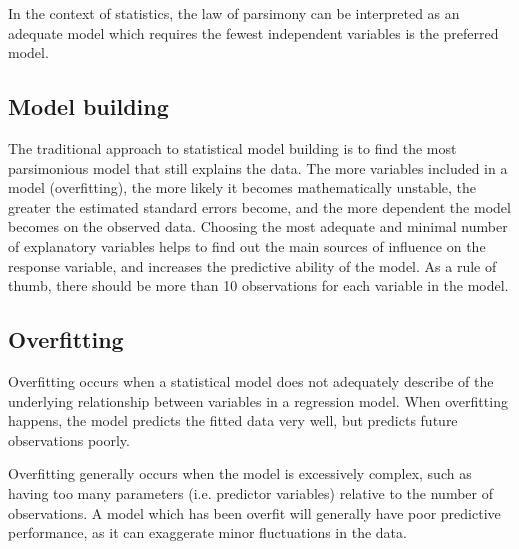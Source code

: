 \documentclass[a4paper,12pt]{article}
\begin{document}
In the context of statistics, the law of parsimony can be interpreted as an adequate model which requires the fewest independent variables is the preferred model.

\subsection{Model building}

The traditional approach to statistical model building is to find the most parsimonious model that still explains the data. The more variables included in a model (overfitting), the more likely it becomes mathematically unstable, the greater the estimated standard errors become, and the more dependent the model becomes on the observed data. Choosing the most adequate and minimal number of explanatory variables helps to find out the main sources of influence on the response variable, and increases the predictive ability of the model. As a rule of thumb, there should be more than 10 observations for each variable in the model.
%


\subsection{Overfitting}

Overfitting occurs when a statistical model does not adequately describe of the underlying relationship between variables in a regression model. When overfitting happens, the model predicts the fitted data very well, but predicts future observations poorly.

Overfitting generally occurs when the model is excessively complex, such as having too many parameters (i.e. predictor variables) relative to the number of observations. A model which has been overfit will generally have poor predictive performance, as it can exaggerate minor fluctuations in the data.

\end{document}
